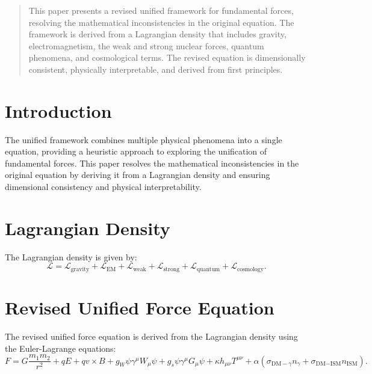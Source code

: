 \documentclass[12pt, a4paper]{article}
\begin{document}
\date{\today}


\maketitle

\begin{abstract}
This paper presents a revised unified framework for fundamental forces, resolving the mathematical inconsistencies in the original equation. The framework is derived from a Lagrangian density that includes gravity, electromagnetism, the weak and strong nuclear forces, quantum phenomena, and cosmological terms. The revised equation is dimensionally consistent, physically interpretable, and derived from first principles.
\end{abstract}

\section{Introduction}
The unified framework combines multiple physical phenomena into a single equation, providing a heuristic approach to exploring the unification of fundamental forces. This paper resolves the mathematical inconsistencies in the original equation by deriving it from a Lagrangian density and ensuring dimensional consistency and physical interpretability.

\section{Lagrangian Density}
The Lagrangian density is given by:
\[
\mathcal{L} = \mathcal{L}_{\text{gravity}} + \mathcal{L}_{\text{EM}} + \mathcal{L}_{\text{weak}} + \mathcal{L}_{\text{strong}} + \mathcal{L}_{\text{quantum}} + \mathcal{L}_{\text{cosmology}}.
\]

\section{Revised Unified Force Equation}
The revised unified force equation is derived from the Lagrangian density using the Euler-Lagrange equations:
\[
F = G\frac{m_1 m_2}{r^2} + qE + qv \times B + g_W \psi \gamma^\mu W_\mu \psi + g_s \psi \gamma^\mu G_\mu \psi + \kappa h_{\mu\nu} T^{\mu\nu} + \alpha \left( \sigma_{\text{DM}-\gamma} n_{\gamma} + \sigma_{\text{DM}-\text{ISM}} n_{\text{ISM}} \right).
\]
\end{document}

